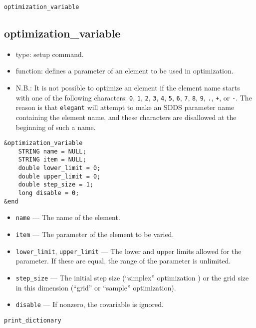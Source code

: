 \documentclass[11pt]{article}
\begin{document}
\begin{latexonly}
\newpage
\begin{center}{\Large\verb|optimization_variable|}\end{center}
\end{latexonly}
\subsection{optimization\_variable \label{subsec:optimizationvariable}}

\begin{itemize}
\item type: setup command.
\item function: defines a parameter of an element to be used in optimization.
\item N.B.: It is not possible to optimize an element if the element name starts with one of the following
characters: 
\verb|0|, \verb|1|, \verb|2|, \verb|3|, \verb|4|, \verb|5|, \verb|6|, \verb|7|, \verb|8|,
\verb|9|, \verb|.|, \verb|+|, or \verb|-|.  The reason is that {\tt elegant} will attempt to 
make an SDDS parameter name containing the element name, and these characters are disallowed
at the beginning of such a name.
\end{itemize}

\begin{verbatim}
&optimization_variable
    STRING name = NULL;
    STRING item = NULL;
    double lower_limit = 0;
    double upper_limit = 0;
    double step_size = 1;
    long disable = 0;
&end
\end{verbatim}

\begin{itemize}
\item \verb|name| --- The name of the element.
\item \verb|item| --- The parameter of the element to be varied.
\item \verb|lower_limit|, \verb|upper_limit| --- The lower and upper limits allowed for the parameter.  If these are
equal, the range of the parameter is unlimited.
\item \verb|step_size| --- The initial step size (``simplex'' optimization ) or the grid size in this dimension (``grid'' or ``sample'' optimization).
\item \verb|disable| --- If nonzero, the covariable is ignored.
\end{itemize}

\begin{latexonly}
\newpage
\begin{center}{\Large\verb|print_dictionary|}\end{center}
\end{latexonly}
\end{document}
